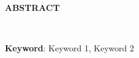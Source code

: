 \clearpage

\begin{minipage}{\textwidth}
\end{minipage}

\normalsize \bfseries \centering \MakeUppercase{Abstract}
% 
\\[2\baselineskip]

\justifying \normalfont \normalsize{

}

\textbf{Keyword}: Keyword 1, Keyword 2
\clearpage